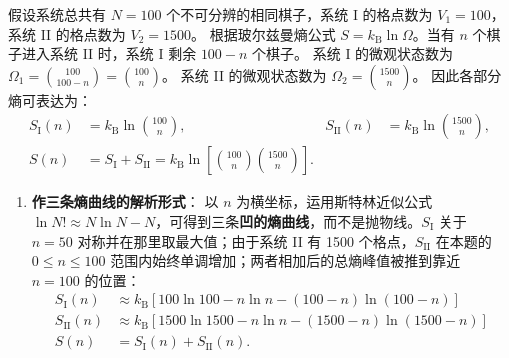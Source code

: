 \begin{solution}
假设系统总共有 $N = 100$ 个不可分辨的相同棋子，系统 I 的格点数为 $V_1 = 100$，系统 II 的格点数为 $V_2 = 1500$。
根据玻尔兹曼熵公式 $S = k_{\mathrm{B}} \ln \Omega$。当有 $n$ 个棋子进入系统 II 时，系统 I 剩余 $100-n$ 个棋子。
系统 I 的微观状态数为 $\Omega_1 = \binom{100}{100-n} = \binom{100}{n}$。
系统 II 的微观状态数为 $\Omega_2 = \binom{1500}{n}$。
因此各部分熵可表达为：
\[
\begin{aligned}
S_{\mathrm{I}}(n)&=k_{\mathrm{B}}\ln\binom{100}{n}, &
S_{\mathrm{II}}(n)&=k_{\mathrm{B}}\ln\binom{1500}{n},\\
S(n)&=S_{\mathrm{I}}+S_{\mathrm{II}}
=k_{\mathrm{B}}\ln\!\left[\binom{100}{n}\binom{1500}{n}\right].
\end{aligned}
\]

\begin{enumerate}
    \item[(a)] \textbf{作三条熵曲线的解析形式}：
    以 $n$ 为横坐标，运用斯特林近似公式 $\ln N! \approx N \ln N - N$，可得到三条\textbf{凹的熵曲线}，而不是抛物线。$S_{\mathrm I}$ 关于 $n=50$ 对称并在那里取最大值；由于系统 II 有 1500 个格点，$S_{\mathrm{II}}$ 在本题的 $0\le n\le100$ 范围内始终单调增加；两者相加后的总熵峰值被推到靠近 $n=100$ 的位置：
    \begin{align*}
        S_{\mathrm{I}}(n) &\approx k_{\mathrm{B}} [100\ln 100 - n\ln n - (100-n)\ln(100-n)] \\
        S_{\mathrm{II}}(n) &\approx k_{\mathrm{B}} [1500\ln 1500 - n\ln n - (1500-n)\ln(1500-n)] \\
        S(n) &= S_{\mathrm{I}}(n) + S_{\mathrm{II}}(n).
    \end{align*}


\end{enumerate}
\end{solution}
